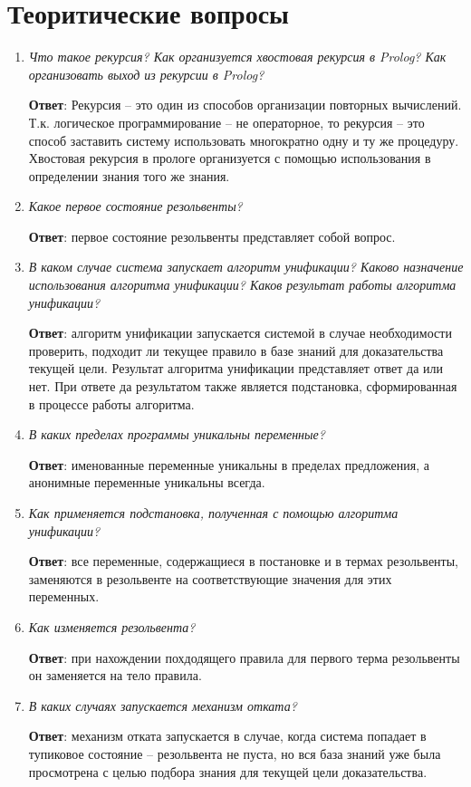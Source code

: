 {\large\section*{Теоритические вопросы}}

\begin{enumerate}
	\item \textit{Что такое рекурсия? Как организуется хвостовая рекурсия в Prolog? Как организовать выход из рекурсии в Prolog?}

	\qquad \textbf{Ответ}: Рекурсия -- это один из способов организации повторных вычислений. Т.к. логическое программирование -- не операторное, то рекурсия -- это способ заставить систему использовать многократно одну и ту же процедуру. Хвостовая рекурсия в прологе организуется с помощью использования в определении знания того же знания.

	\item \textit{Какое первое состояние резольвенты?}
	
	\qquad \textbf{Ответ}: первое состояние резольвенты представляет собой вопрос.

	\item \textit{В каком случае система запускает алгоритм унификации? Каково назначение использования алгоритма унификации? Каков результат работы алгоритма унификации?}

	\qquad \textbf{Ответ}: алгоритм унификации запускается системой в случае необходимости проверить, подходит ли текущее правило в базе знаний для доказательства текущей цели. Результат алгоритма унификации представляет ответ да или нет. При ответе да результатом также является подстановка, сформированная в процессе работы алгоритма.
	
	\item \textit{В каких пределах программы уникальны переменные?}
	
	\qquad \textbf{Ответ}: именованные переменные уникальны в пределах предложения, а анонимные переменные уникальны всегда.

	\item \textit{Как применяется подстановка, полученная с помощью алгоритма унификации?}
	
	\qquad \textbf{Ответ}: все переменные, содержащиеся в постановке и в термах резольвенты, заменяются в резольвенте на соответствующие значения для этих переменных.

	\item \textit{Как изменяется резольвента?}
	
	\qquad \textbf{Ответ}: при нахождении похдодящего правила для первого терма резольвенты он заменяется на тело правила.
	
	\item \textit{В каких случаях запускается механизм отката?}

	\qquad \textbf{Ответ}: механизм отката запускается в случае, когда система попадает в тупиковое состояние -- резольвента не пуста, но вся база знаний уже была просмотрена с целью подбора знания для текущей цели доказательства.
\end{enumerate}

